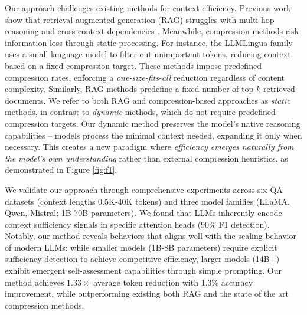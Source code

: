 Our approach challenges existing methods for context efficiency. Previous work show that retrieval-augmented generation (RAG) struggles with multi-hop reasoning and cross-context dependencies \citep{ragvslc}. Meanwhile, compression methods risk information loss through static processing. For instance, the LLMLingua family \citep{llmlingua,longllmlingua,llmlingua2} uses a small language model to filter out unimportant tokens, reducing context based on a fixed compression target. These methods impose predefined compression rates, enforcing a \textit{one-size-fits-all} reduction regardless of content complexity. Similarly, RAG methods predefine a fixed number of top-$k$ retrieved documents. We refer to both RAG and compression-based approaches as \textit{static} methods, in contrast to \textit{dynamic} methods, which do not require predefined compression targets. Our dynamic method preserves the model's native reasoning capabilities – models process the minimal context needed, expanding it only when necessary. This creates a new paradigm where \textit{efficiency emerges naturally from the model's own understanding} rather than external compression heuristics, as demonstrated in Figure \ref{fig:f1}.

 
We validate our approach through comprehensive experiments across six QA datasets (context lengths 0.5K-40K tokens) and three model families (LLaMA, Qwen, Mistral; 1B-70B parameters). We found that LLMs inherently encode context sufficiency signals in specific attention heads (90\% F1 detection). Notably, our method reveals behaviors that aligns well with the scaling behavior of modern LLMs: while smaller models (1B-8B parameters) require explicit sufficiency detection to achieve competitive efficiency, larger models (14B+) exhibit emergent self-assessment capabilities through simple prompting. Our method achieves $1.33\times$ average token reduction with 1.3\% accuracy improvement, while outperforming existing both RAG and the state of the art compression methods. 


